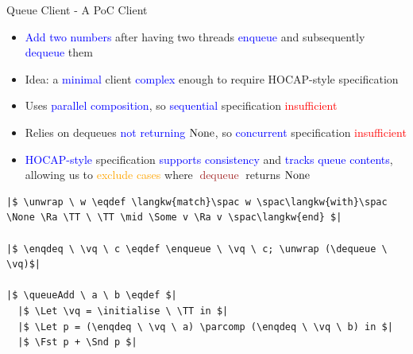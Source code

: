 \documentclass[9pt,xcolor={dvipsnames}]{beamer}
\newcommand{\initialise}{\operatorname{initialize}}
\newcommand{\enqueue}{\operatorname{enqueue}}
\newcommand{\dequeue}{\operatorname{dequeue}}
\newcommand{\unwrap}{\operatorname{unwrap}}
\newcommand{\enqdeq}{\operatorname{enqdeq}}
\newcommand{\queueAdd}{\operatorname{queueAdd}}
\newcommand{\parcomp}{\ensuremath{\mathbin{||}}}
\newcommand{\vq}{v_q}
\begin{document}
\begin{frame}[fragile]{Queue Client - A PoC Client}
  \begin{itemize}
    \item \textcolor{blue}{Add two numbers} after having two threads \textcolor{blue}{enqueue} and subsequently \textcolor{blue}{dequeue} them
    \item<2-> Idea: a \textcolor{blue}{minimal} client \textcolor{blue}{complex} enough to require HOCAP-style specification
    \item<3-> Uses \textcolor{blue}{parallel composition}, so \textcolor{blue}{sequential} specification \textcolor{red}{insufficient}
    \item<4-> Relies on dequeues \textcolor{blue}{not returning $\operatorname{None}$}, so \textcolor{blue}{concurrent} specification \textcolor{red}{insufficient}
    \item<5-> \textcolor{blue}{HOCAP-style} specification \textcolor{blue}{supports consistency} and \textcolor{blue}{tracks queue contents}, allowing us to \textcolor{orange}{exclude cases} where \textcolor{Brown}{$\dequeue$} returns $\operatorname{None}$
  \end{itemize}
  \begin{verbatim}
|$ \unwrap \ w \eqdef \langkw{match}\spac w \spac\langkw{with}\spac \None \Ra \TT \ \TT \mid \Some v \Ra v \spac\langkw{end} $|

|$ \enqdeq \ \vq \ c \eqdef \enqueue \ \vq \ c; \unwrap (\dequeue \ \vq)$|

|$ \queueAdd \ a \ b \eqdef $|
  |$ \Let \vq = \initialise \ \TT in $|
  |$ \Let p = (\enqdeq \ \vq \ a) \parcomp (\enqdeq \ \vq \ b) in $|
  |$ \Fst p + \Snd p $|
  \end{verbatim}
\end{frame}
\end{document}
